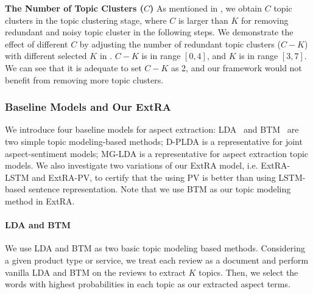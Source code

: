 \textbf{The Number of Topic Clusters ($C$)}
As mentioned in , 
we obtain $C$ topic clusters in the topic clustering stage, 
where $C$ is larger than $K$ 
for removing redundant and noisy topic cluster in the following steps.
We demonstrate the effect of different $C$ by adjusting the number of redundant topic clusters ($C-K$) with different selected $K$ in .
$C-K$ is in range $[0,4]$, and $K$ is in range $[3,7]$. 
We can see that it is adequate to set $C-K$
as 2, and our framework would not benefit from removing more topic clusters.

\subsubsection{Baseline Models and Our ExtRA} 
We introduce four baseline models for aspect extraction:
LDA~\cite{Blei2003LatentDA} and BTM~\cite{cheng2014btm} are two simple topic modeling-based methods;
D-PLDA \cite{moghaddam2012design} is a representative for joint aspect-sentiment models;
MG-LDA \cite{titov2008modeling} is a representative for aspect extraction topic models.
We also investigate two variations of our ExtRA model, i.e. ExtRA-LSTM and ExtRA-PV, 
to certify that the using PV is better than using LSTM-based sentence representation.
Note that we use BTM as our topic modeling method in ExtRA.

\paragraph{LDA and BTM}
We use LDA and BTM as two basic topic modeling based methods. 
Considering a given product type or service, 
we treat each review as a document and perform vanilla LDA and BTM on 
the reviews to extract $K$ topics.
Then, we select the words with highest probabilities in each topic as our extracted aspect terms.



